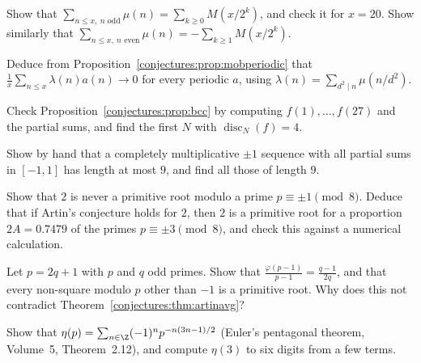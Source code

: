 \begin{exercise}[$\star$]\label{conjectures:ex:oddmobius}
Show that $\sum_{n\le x,\ n\text{ odd}}\mu(n)=\sum_{k\ge0}M(x/2^k)$, and check it for $x=20$. Show similarly that $\sum_{n\le x,\ n\text{ even}}\mu(n)=-\sum_{k\ge1}M(x/2^k)$.
\end{exercise}

\begin{exercise}[$\star\star$]\label{conjectures:ex:liouvilleperiodic}
Deduce from Proposition~\ref{conjectures:prop:mobperiodic} that $\frac1x\sum_{n\le x}\lambda(n)a(n)\to0$ for every periodic $a$, using $\lambda(n)=\sum_{d^2\mid n}\mu(n/d^2)$.
\end{exercise}

\begin{exercise}[$\star$]\label{conjectures:ex:edpcheck}
Check Proposition~\ref{conjectures:prop:bcc} by computing $f(1),\dots,f(27)$ and the partial sums, and find the first $N$ with $\operatorname{disc}_N(f)=4$.
\end{exercise}

\begin{exercise}[$\star\star$]\label{conjectures:ex:multone}
Show by hand that a completely multiplicative $\pm1$ sequence with all partial sums in $[-1,1]$ has length at most $9$, and find all those of length $9$.
\end{exercise}

\begin{exercise}[$\star$]\label{conjectures:ex:artinmod8}
Show that $2$ is never a primitive root modulo a prime $p\equiv\pm1\pmod8$. Deduce that if Artin's conjecture holds for $2$, then $2$ is a primitive root for a
proportion $2A=0.7479$ of the primes $p\equiv\pm3\pmod8$, and check this against a numerical calculation.
\end{exercise}

\begin{exercise}[$\star\star$]\label{conjectures:ex:artinsg}
Let $p=2q+1$ with $p$ and $q$ odd primes. Show that $\frac{\varphi(p-1)}{p-1}=\frac{q-1}{2q}$, and that every non-square modulo $p$ other than $-1$ is a primitive root.
Why does this not contradict Theorem~\ref{conjectures:thm:artinavg}?
\end{exercise}

\begin{exercise}[$\star$]\label{conjectures:ex:etapent}
Show that $\eta(p)=\sum_{n\in\Z}(-1)^np^{-n(3n-1)/2}$ (Euler's pentagonal theorem, Volume~5, Theorem~2.12), and compute $\eta(3)$ to six digits from a few terms.
\end{exercise}

